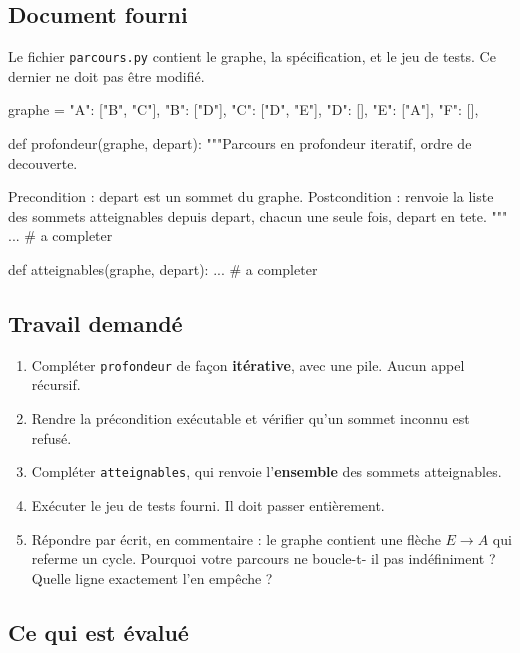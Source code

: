 \subsection*{Document fourni}

Le fichier \lstinline{parcours.py} contient le graphe, la spécification, et le
jeu de tests. Ce dernier ne doit pas être modifié.

\begin{python}
graphe = {
    "A": ["B", "C"],
    "B": ["D"],
    "C": ["D", "E"],
    "D": [],
    "E": ["A"],
    "F": [],
}

def profondeur(graphe, depart):
    """Parcours en profondeur iteratif, ordre de decouverte.

    Precondition  : depart est un sommet du graphe.
    Postcondition : renvoie la liste des sommets atteignables depuis
                    depart, chacun une seule fois, depart en tete.
    """
    ...          # a completer

def atteignables(graphe, depart):
    ...          # a completer
\end{python}

\subsection*{Travail demandé}

\begin{enumerate}
  \item Compléter \lstinline{profondeur} de façon \textbf{itérative}, avec une
    pile. Aucun appel récursif.

  \item Rendre la précondition exécutable et vérifier qu'un sommet inconnu est
    refusé.

  \item Compléter \lstinline{atteignables}, qui renvoie l'\textbf{ensemble} des
    sommets atteignables.

  \item Exécuter le jeu de tests fourni. Il doit passer entièrement.

  \item Répondre par écrit, en commentaire : le graphe contient une flèche
    $E \rightarrow A$ qui referme un cycle. Pourquoi votre parcours ne boucle-t-
    il pas indéfiniment ? Quelle ligne exactement l'en empêche ?
\end{enumerate}

\subsection*{Ce qui est évalué}

